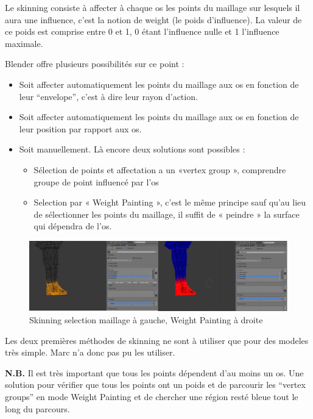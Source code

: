 \documentclass[11pt]{report}
\begin{document}
Le skinning consiste à affecter à chaque os les points du maillage sur lesquels il aura une influence, c’est la notion de weight (le poids d’influence). La valeur de ce poids est comprise entre 0 et 1, 0 étant l’influence nulle et 1 l’influence maximale.

Blender offre plusieurs possibilités sur ce point :

\begin{itemize}
\item Soit affecter automatiquement les points du maillage aux os en  fonction de leur ``envelope'', c’est à dire leur rayon d’action.
\item Soit affecter automatiquement les points du maillage aux os en  fonction de leur position par rapport aux os.
\item Soit manuellement. Là encore deux solutions sont possibles :
\begin{itemize}
\item Sélection de points et affectation a un «vertex group », comprendre groupe de point influencé par l’os
\item Selection par « Weight Painting », c’est le même principe sauf qu’au lieu de sélectionner les points du maillage, il suffit de « peindre » la surface qui dépendra de l’os.
\end{itemize}
\end{itemize}

\begin{figure}[htbp]
\centering
\includegraphics[scale=0.8]{skinning.png}
\caption{Skinning selection maillage à gauche, Weight Painting à droite}
\end{figure}

Les deux premières méthodes de skinning ne sont à utiliser que pour des modeles très simple. Marc n’a donc pas pu les utiliser.

\noindent\textbf{N.B.} Il est très important que tous les points dépendent d’au moins un os. Une solution pour vérifier que tous les points ont un poids et de parcourir les ``vertex groups'' en mode Weight Painting et de chercher une région resté bleue tout le long du parcours.
\end{document}
